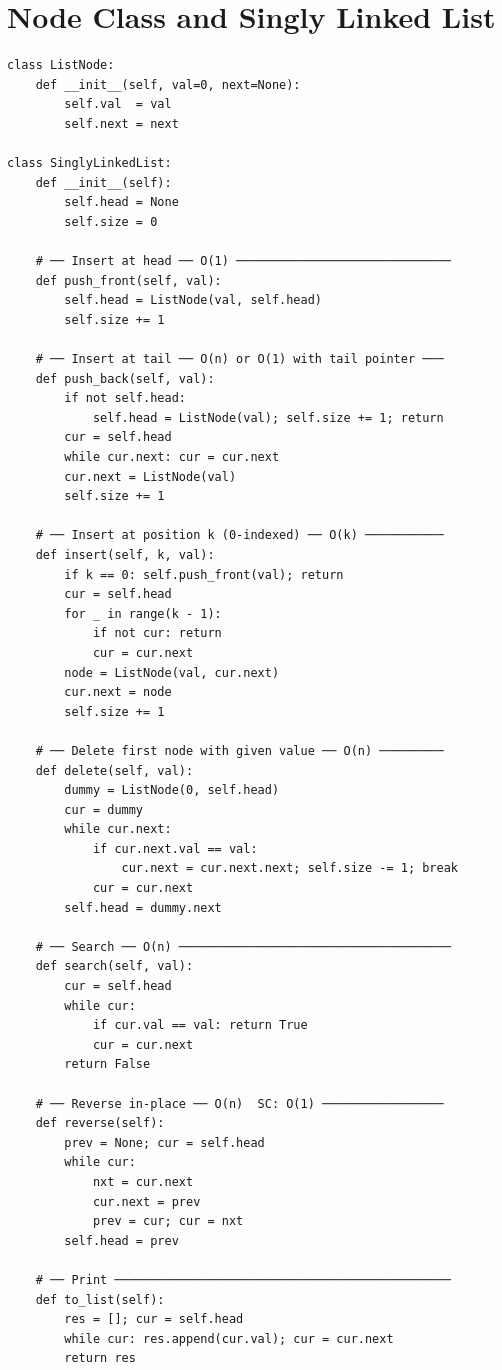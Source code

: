 \documentclass[11pt,a4paper]{report}
\begin{document}
\section{Node Class and Singly Linked List}

\begin{lstlisting}
class ListNode:
    def __init__(self, val=0, next=None):
        self.val  = val
        self.next = next

class SinglyLinkedList:
    def __init__(self):
        self.head = None
        self.size = 0

    # ── Insert at head ── O(1) ──────────────────────────────
    def push_front(self, val):
        self.head = ListNode(val, self.head)
        self.size += 1

    # ── Insert at tail ── O(n) or O(1) with tail pointer ───
    def push_back(self, val):
        if not self.head:
            self.head = ListNode(val); self.size += 1; return
        cur = self.head
        while cur.next: cur = cur.next
        cur.next = ListNode(val)
        self.size += 1

    # ── Insert at position k (0-indexed) ── O(k) ───────────
    def insert(self, k, val):
        if k == 0: self.push_front(val); return
        cur = self.head
        for _ in range(k - 1):
            if not cur: return
            cur = cur.next
        node = ListNode(val, cur.next)
        cur.next = node
        self.size += 1

    # ── Delete first node with given value ── O(n) ─────────
    def delete(self, val):
        dummy = ListNode(0, self.head)
        cur = dummy
        while cur.next:
            if cur.next.val == val:
                cur.next = cur.next.next; self.size -= 1; break
            cur = cur.next
        self.head = dummy.next

    # ── Search ── O(n) ──────────────────────────────────────
    def search(self, val):
        cur = self.head
        while cur:
            if cur.val == val: return True
            cur = cur.next
        return False

    # ── Reverse in-place ── O(n)  SC: O(1) ─────────────────
    def reverse(self):
        prev = None; cur = self.head
        while cur:
            nxt = cur.next
            cur.next = prev
            prev = cur; cur = nxt
        self.head = prev

    # ── Print ───────────────────────────────────────────────
    def to_list(self):
        res = []; cur = self.head
        while cur: res.append(cur.val); cur = cur.next
        return res
\end{lstlisting}
\end{document}
